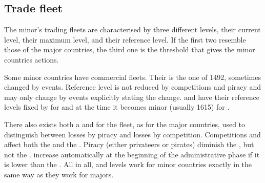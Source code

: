 \label{chExpenses:Administration Minor}



\subsection{Trade fleet}\label{chExpenses:Minor Commercial Fleets}

\begin{note}
  The minor's trading fleets are characterised by three different levels,
  their current level, their maximum level, and their reference level. If the
  first two resemble those of the major countries, the third one is the
  threshold that gives the minor countries \TFI actions.
\end{note}

 Some minor countries have commercial
fleets. Their  is the one of 1492, sometimes changed by
events. Reference level is not reduced by competitions and piracy and may only
change by events explicitly stating the change.
\bparag[Exception] \paysPortugal and \paysVenise have their reference levels
fixed by  for \paysPortugal and at the time
it becomes minor (usually 1615) for \paysVenise.

\aparag There also exists both a  and  for the fleet, as for the major countries, used to distinguish
between losses by piracy and losses by competition.
\bparag Competitions and \TFI affect both the  and the
.
\bparag Piracy (either privateers or pirates) diminish the , but not the .
\bparag {} increase automatically at the beginning of the
administrative phase if it is lower than the .
\bparag All in all,  and  levels work for minor
countries exactly in the same way as they work for majors.



